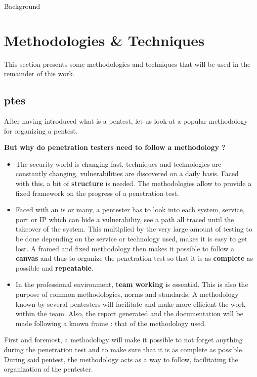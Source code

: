 \begin{chaptercover}{Background}
\section{Methodologies \& Techniques}

This section presents some methodologies and techniques that will be used in the remainder of this work.

\subsection{\acrlong{ptes}}

After having introduced what is a pentest, let us look at a popular methodology for organizing a pentest.

\begin{question}
\textbf{But why do penetration testers need to follow a methodology ?}
\begin{itemize}
  \item The security world is changing fast, techniques and technologies are constantly changing, vulnerabilities are discovered on a daily basis. Faced with this, a bit of \textbf{structure} is needed. The methodologies allow to provide a fixed framework on the progress of a penetration test.
  \item Faced with an \acrshort{is} or many, a pentester has to look into each system, service, port or IP which can hide a vulnerability, see a path all traced until the takeover of the system. This multiplied by the very large amount of testing to be done depending on the service or technology used, makes it is easy to get lost. A framed and fixed methodology then makes it possible to follow a \textbf{canvas} and thus to organize the penetration test so that it is as \textbf{complete} as possible and \textbf{repeatable}.
  \item In the professional environment, \textbf{team working} is essential. This is also the purpose of common methodologies, norms and standards. A methodology known by several pentesters will facilitate and make more efficient the work within the team. Also, the report generated and the documentation will be made following a known frame : that of the methodology used.
\end{itemize}
\end{question}

First and foremost, a methodology will make it possible to not forget anything during the penetration test and to make sure that it is as complete as possible. During said pentest, the methodology acts as a way to follow, facilitating the organization of the pentester.


\end{chaptercover}
